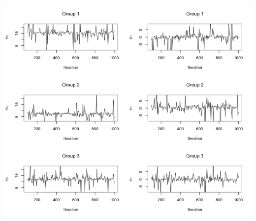 \documentclass[12pt,letterpaper]{article}\usepackage[]{graphicx}\usepackage[]{color}
\begin{document}
\includegraphics[width=14cm, height=20cm, keepaspectratio]
  {genes-groupshrink-mus.png}\\
\end{document}
